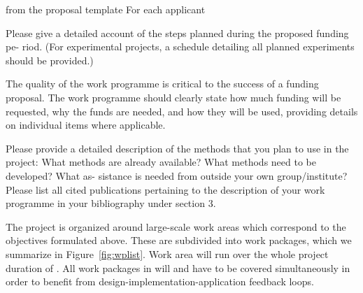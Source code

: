 \begin{todo}{from the proposal template}
For each applicant

Please give a detailed account of the steps planned during the proposed funding pe-
riod. (For experimental projects, a schedule detailing all planned experiments should
be provided.)

The quality of the work programme is critical to the success of a funding proposal. The
work programme should clearly state how much funding will be requested, why the
funds are needed, and how they will be used, providing details on individual items
where applicable.

Please provide a detailed description of the methods that you plan to use in the project:
What methods are already available? What methods need to be developed? What as-
sistance is needed from outside your own group/institute?
Please list all cited publications pertaining to the description of your work programme
in your bibliography under section 3.
\end{todo}

The project is organized around  large-scale work areas which correspond
to the objectives formulated above. These are subdivided into  work
packages, which we summarize in Figure~\ref{fig:wplist}. Work area
 will run over the whole project duration of {\pn}. All
{} work packages in {} will and have to be
covered simultaneously in order to benefit from design-implementation-application feedback
loops.

\wpfig

